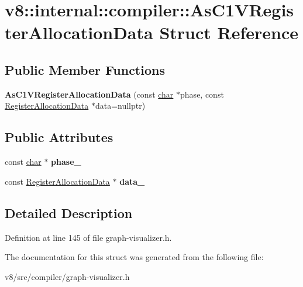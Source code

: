 \hypertarget{structv8_1_1internal_1_1compiler_1_1AsC1VRegisterAllocationData}{}\section{v8\+:\+:internal\+:\+:compiler\+:\+:As\+C1\+V\+Register\+Allocation\+Data Struct Reference}
\label{structv8_1_1internal_1_1compiler_1_1AsC1VRegisterAllocationData}
\subsection*{Public Member Functions}
\begin{DoxyCompactItemize}
\item 
\mbox{\label{structv8_1_1internal_1_1compiler_1_1AsC1VRegisterAllocationData_ae9442047711e720756b551818a66b533}} 
{\bfseries As\+C1\+V\+Register\+Allocation\+Data} (const \mbox{\hyperlink{classchar}{char}} $\ast$phase, const \mbox{\hyperlink{classv8_1_1internal_1_1compiler_1_1RegisterAllocationData}{Register\+Allocation\+Data}} $\ast$data=nullptr)
\end{DoxyCompactItemize}
\subsection*{Public Attributes}
\begin{DoxyCompactItemize}
\item 
\mbox{\label{structv8_1_1internal_1_1compiler_1_1AsC1VRegisterAllocationData_a179a0b3dc98004412380d53663ba1290}} 
const \mbox{\hyperlink{classchar}{char}} $\ast$ {\bfseries phase\+\_\+}
\item 
\mbox{\label{structv8_1_1internal_1_1compiler_1_1AsC1VRegisterAllocationData_a281a39025bf7a8c1dfb6f4f74995df1d}} 
const \mbox{\hyperlink{classv8_1_1internal_1_1compiler_1_1RegisterAllocationData}{Register\+Allocation\+Data}} $\ast$ {\bfseries data\+\_\+}
\end{DoxyCompactItemize}


\subsection{Detailed Description}


Definition at line 145 of file graph-\/visualizer.\+h.



The documentation for this struct was generated from the following file\+:\begin{DoxyCompactItemize}
\item 
v8/src/compiler/graph-\/visualizer.\+h\end{DoxyCompactItemize}
